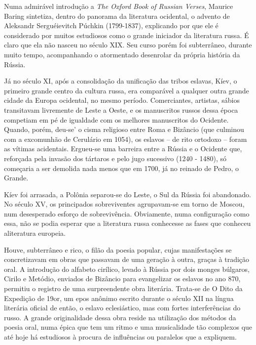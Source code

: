 Numa admirável introdução a \emph{The Oxford Book of Russian Verses},
Maurice Baring sintetiza, dentro do panorama da literatura ocidental, o
advento de Aleksandr Serguéievitch Púchkin (1799-1837), explicando por
que ele é considerado por muitos estudiosos como o grande iniciador da
literatura russa. É claro que ela não nasceu no século XIX. Seu curso
porém foi subterrâneo, durante muito tempo, acompanhando o atormentado
desenrolar da própria história da Rússia.

Já no século XI, após a consolidação da unificação das tribos eslavas,
Kíev, o primeiro grande centro da cultura russa, era comparável a
qualquer outra grande cidade da Europa ocidental, no mesmo período.
Comerciantes, artistas, sábios transitavam livremente de Leste a Oeste,
e os manuscritos russos dessa época competiam em pé de igualdade com os
melhores manuscritos do Ocidente. Quando, porém, deu-se' o cisma
religioso entre Roma e Bizâncio (que culmi­nou com a excomunhão de
Cerulário em 1054), os eslavos -- de rito ortodoxo -- foram as vítimas
acidentais. Ergueu-se uma barreira entre a Rússia e o Ociden­te que,
reforçada pela invasão dos tártaros e pelo jugo sucessivo (1240 - 1480),
só começaria a ser demolida nada menos que em 1700, já no reinado de
Pedro, o Grande.

Kíev foi arrasada, a Polônia separou-se do Leste, o Sul da Rússia foi
abando­nado. No século XV, os principados sobreviventes agrupavam-se em
torno de Moscou, num desesperado esforço de sobrevivência. Obviamente,
numa con­figuração como essa, não se podia esperar que a literatura
russa conhecesse as fases que conheceu aliteratura europeia.

Houve, subterrâneo e rico, o filão da poesia popular, cujas
manifestações se concretizavam em obras que passavam de uma geração à
outra, graças à tradi­ção oral. A introdução do alfabeto cirílico,
levado à Rússia por dois monges búlgaros, Cirilo e Metódio, enviados de
Bizâncio para evangelizar os eslavos no ano 870, permitiu o registro de
uma surpreendente obra literária. Trata-se de O Dito da Expedição de
19or, um epos anônimo escrito durante o século XII na língua literária
oficial de então, o eslavo eclesiástico, mas com fortes interfe­rências
do russo. A grande originalidade dessa obra reside na utilização dos
métodos da poesia oral, numa épica que tem um ritmo e uma musicalidade
tão complexos que até hoje há estudiosos à procura de influências ou
paralelos que a expliquem.

